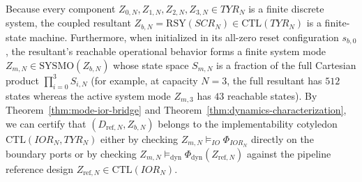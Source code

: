 Because every component $Z_{0,N},Z_{1,N},Z_{2,N},Z_{3,N}\in TYR_N$ is a finite discrete system, the coupled resultant $Z_{b,N}=\mathrm{RSY}(SCR_N)\in\mathrm{CTL}(TYR_N)$ is a finite-state machine. Furthermore, when initialized in its all-zero reset configuration $s_{b,0}$, the resultant's reachable operational behavior forms a finite system mode $Z_{m,N}\in\mathrm{SYSMO}(Z_{b,N})$ whose state space $S_{m,N}$ is a fraction of the full Cartesian product $\prod_{i=0}^3 S_{i,N}$ (for example, at capacity $N=3$, the full resultant has $512$ states whereas the active system mode $Z_{m,3}$ has $43$ reachable states). By Theorem~\ref{thm:mode-ior-bridge} and Theorem~\ref{thm:dynamics-characterization}, we can certify that $(D_{\mathrm{ref},N},Z_{b,N})$ belongs to the implementability cotyledon $\mathrm{CTL}(IOR_N,TYR_N)$ either by checking $Z_{m,N}\models_{IO}\Phi_{IOR_N}$ directly on the boundary ports or by checking $Z_{m,N}\models_{\mathrm{dyn}}\Phi_{\mathrm{dyn}}(Z_{\mathrm{ref},N})$ against the pipeline reference design $Z_{\mathrm{ref},N}\in\mathrm{CTL}(IOR_N)$.
